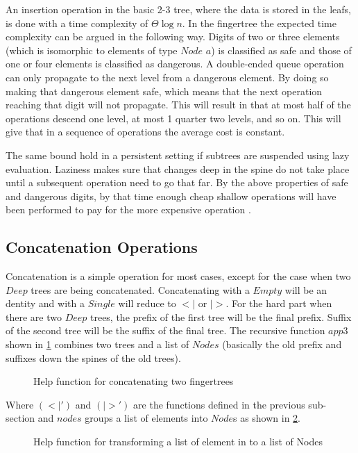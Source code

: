 An insertion operation in the basic 2-3 tree, where the data is stored in the
leafs, is done with a time complexity of $\Theta \log n$. In the fingertree the
expected time complexity can be argued in the following way. Digits of two or
three elements (which is isomorphic to elements of type $Node$ $a$) is
classified as safe and those of one or four elements is classified as dangerous.
A double-ended queue operation can only propagate to the next level from a
dangerous element. By doing so making that dangerous element safe, which means
that the next operation reaching that digit will not propagate. This will result
in that at most half of the operations descend one level, at most 1 quarter two
levels, and so on. This will give that in a sequence of operations the average
cost is constant.

The same bound hold in a persistent setting if subtrees are suspended using lazy
evaluation. Laziness makes sure that changes deep in the spine do not take place
until a subsequent operation need to go that far. By the above properties
of safe and dangerous digits, by that time enough cheap shallow operations
will have been performed to pay for the more expensive operation
\cite{fingertree}.

\subsection{Concatenation Operations}
Concatenation is a simple operation for most cases, except for the case when two
$Deep$ trees are being concatenated. Concatenating with a $Empty$ will be an 
dentity and with a $Single$ will reduce to $<|$ or $|>$. For the hard part when
there are two $Deep$ trees, the prefix of the first tree will be the final
prefix. Suffix of the second tree will be the suffix of the final tree. The
recursive function $app3$ shown in \cref{fig:concatHelp} combines two trees and
a list of $Nodes$ (basically the old prefix and suffixes down the spines of the
old trees).

\begin{figure}[h!]

\caption{Help function for concatenating two fingertrees \label{fig:concatHelp}}
\end{figure}

Where $(<|')$ and $(|>')$ are the functions defined in the previous sub-section
and $nodes$ groups a list of elements into $Node$s as shown in
\cref{fig:nodesHelp}. 

\begin{figure}[h!]

\caption{Help function for transforming a list of element in to a list of Nodes \label{fig:nodesHelp}}
\end{figure}

